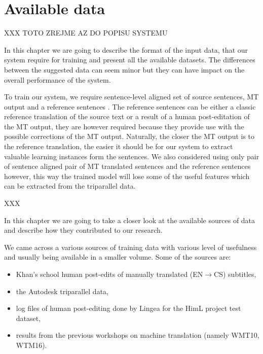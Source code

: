 \chapter{Available data}
\label{chap:data}


XXX TOTO ZREJME AZ DO POPISU SYSTEMU

In this chapter we are going to describe the format of the input data, that
our system require for training and present all the available datasets.
The differences between the suggested data can seem minor but they can
have impact on the overall performance of the system.

To train our system, we require sentence-level aligned set of source sentences,
MT output and a reference sentences
. The reference sentences can be either
a classic reference translation of the source text or a result of a human
post-editation of the MT output, they are however required because they
provide use with the possible corrections of the MT output.
Naturally, the closer the MT output is
to the reference translation, the easier it should be for our system
to extract valuable learning instances form the sentences. We also
considered using only pair of sentence aligned pair of MT translated
sentences and the reference sentences however, this way the trained
model will lose some of the useful features which can be extracted from
the triparallel data.

XXX

In this chapter we are going to take a closer look at the available
sources of data and describe how they contributed to our research.

We came across a various sources of training data with various level
of usefulness and usually being available in a smaller volume. Some of the sources
are:
\begin{itemize}
\item Khan's school human
post-edits of manually translated (EN$\rightarrow$CS) subtitles,
\item the Autodesk
triparallel data,
\item log files of human post-editing done by Lingea for the
HimL project test dataset,


\item results from the previous workshops on machine translation (namely WMT10, WTM16).
\end{itemize}


